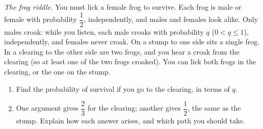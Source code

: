\emph{The frog riddle.} You must lick a female frog to survive. Each frog is male or female with probability $\dfrac{1}{2}$, independently, and males and females look alike. Only males croak: while you listen, each male croaks with probability $q$ ($0<q\le1$), independently, and females never croak. On a stump to one side sits a single frog. In a clearing to the other side are two frogs, and you hear a croak from the clearing (so at least one of the two frogs croaked). You can lick both frogs in the clearing, or the one on the stump.
\begin{enumerate}
\item[(a)] Find the probability of survival if you go to the clearing, in terms of $q$.
\item[(b)] One argument gives $\dfrac{2}{3}$ for the clearing; another gives $\dfrac{1}{2}$, the same as the stump. Explain how each answer arises, and which path you should take.
\end{enumerate}
